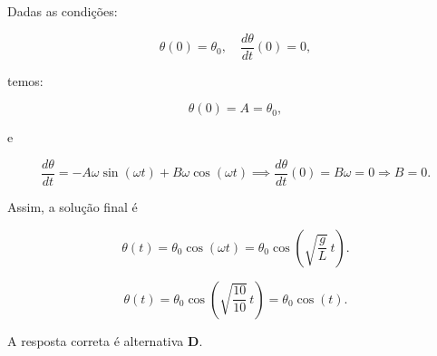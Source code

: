 \begin{flushleft}
Dadas as condições:

\[
\theta(0) = \theta_0, \quad \frac{d\theta}{dt}(0) = 0,
\]

temos:

\[
\theta(0) = A = \theta_0,
\]

e

\[
\frac{d\theta}{dt} = - A \omega \sin(\omega t) + B \omega \cos(\omega t) \implies \frac{d\theta}{dt}(0) = B \omega = 0 \Rightarrow B = 0.
\]

Assim, a solução final é

\[
\theta(t) = \theta_0 \cos(\omega t) = \theta_0 \cos\left(\sqrt{\frac{g}{L}} \, t \right).
\]

\[
\boxed{
\theta(t) = \theta_0 \cos\left(\sqrt{\frac{10}{10}} \, t \right) = \theta_0 \cos\left(t \right).
}
\]

A resposta correta é alternativa \colorbox{green!50}{\textbf{D}}.
\end{flushleft}


